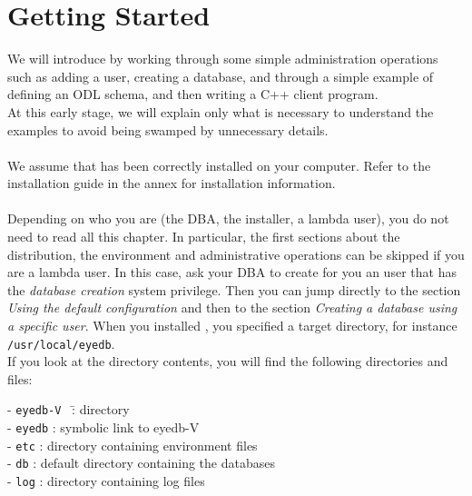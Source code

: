 

\newcommand{\mantitle}{\textsc{Getting Started}}


\tableofcontents

\newcommand{\EYEDBARCH}{\emph{eyedbtop}/\texttt{eyedb-V\eyedbversion}/\emph{archdir}}

\chapter{Getting Started}

We will introduce \eyedb by working through some simple administration
operations such as adding a user, creating a database, and through
a simple example of defining an ODL schema, and then writing a C++
client program.
\\
At this early stage, we will explain only what is necessary to understand
the examples to avoid being swamped by unnecessary details.
\\
\\
We assume that \eyedb has been correctly installed on your
computer.
Refer to the installation guide in the annex for installation information.
\\
\\
Depending on who you are (the DBA, the installer, a lambda user), you do not need
to read all this chapter. In particular, the first sections about the
distribution, the environment and administrative operations 
can be skipped if you are a lambda user. In this case, ask your DBA to create
for you an \eyedb user that has the \emph{database creation} system privilege. 
Then you can jump directly to the section
\emph{Using the default configuration} and then to the section
\emph{Creating a database using a specific user}.
When you installed \eyedbX, you specified a target directory, for instance
\texttt{/usr/local/eyedb}.
\\
If you look at the directory contents, you will find the following directories
and files:
\begin{tabbing}
- \texttt{eyedb-V\eyedbversion}\mbox{ } \= : directory \\
- \texttt{eyedb} \> : symbolic link to eyedb-V\eyedbversion \\
- \texttt{etc} \> : directory containing environment files \\
- \texttt{db} \> : default directory containing the databases \\
- \texttt{log} \> : directory containing log files
\end{tabbing}
